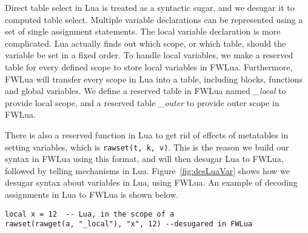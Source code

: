Direct table select in Lua is treated as a syntactic sugar, and we desugar it to computed table select. 
Multiple variable declarations can be represented using a set of single assignment statements. 
The local variable declaration is more complicated. Lua actually finds out which scope, or which table, should the variable be set in a fixed order.
To handle local variables,
we make a reserved table for every defined scope to store local variables in FWLua. Furthermore, FWLua will transfer every scope in Lua into a table, including blocks, functions and global variables. We define a reserved table in FWLua named {\it \_local} to provide local scope, and a reserved table {\it \_outer} to provide outer scope in FWLua.

There is also a reserved function in Lua to get rid of effects of metatables in setting variables, which is {\tt rawset(t, k, v)}. This is the reason we build our syntax in FWLua using this format, and will then desugar Lua to FWLua, followed by telling mechanisms in Lua.
Figure~\ref{fig:desLuaVar} shows how we desugar syntax about variables in Lua, using FWLua.
An example of decoding assignments in Lua to FWLua is shown below.
\begin{verbatim}
local x = 12  -- Lua, in the scope of a
rawset(rawget(a, "_local"), "x", 12) --desugared in FWLua
\end{verbatim}

